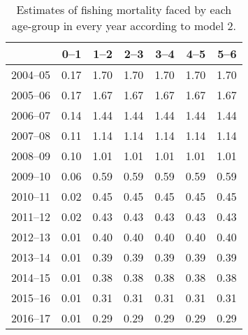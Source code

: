 \begin{table}[ht]
\centering
\begin{tabular}{rrrrrrr}
  \hline
 & 0--1 & 1--2 & 2--3 & 3--4 & 4--5 & 5--6 \\ 
  \hline
2004--05 & 0.17 & 1.70 & 1.70 & 1.70 & 1.70 & 1.70 \\ 
  2005--06 & 0.17 & 1.67 & 1.67 & 1.67 & 1.67 & 1.67 \\ 
  2006--07 & 0.14 & 1.44 & 1.44 & 1.44 & 1.44 & 1.44 \\ 
  2007--08 & 0.11 & 1.14 & 1.14 & 1.14 & 1.14 & 1.14 \\ 
  2008--09 & 0.10 & 1.01 & 1.01 & 1.01 & 1.01 & 1.01 \\ 
  2009--10 & 0.06 & 0.59 & 0.59 & 0.59 & 0.59 & 0.59 \\ 
  2010--11 & 0.02 & 0.45 & 0.45 & 0.45 & 0.45 & 0.45 \\ 
  2011--12 & 0.02 & 0.43 & 0.43 & 0.43 & 0.43 & 0.43 \\ 
  2012--13 & 0.01 & 0.40 & 0.40 & 0.40 & 0.40 & 0.40 \\ 
  2013--14 & 0.01 & 0.39 & 0.39 & 0.39 & 0.39 & 0.39 \\ 
  2014--15 & 0.01 & 0.38 & 0.38 & 0.38 & 0.38 & 0.38 \\ 
  2015--16 & 0.01 & 0.31 & 0.31 & 0.31 & 0.31 & 0.31 \\ 
  2016--17 & 0.01 & 0.29 & 0.29 & 0.29 & 0.29 & 0.29 \\ 
   \hline
\end{tabular}
\caption{Estimates of fishing mortality faced by each age-group in every year according to model 2.} 
\label{tab:Mod2-FishingMortality}
\end{table}
